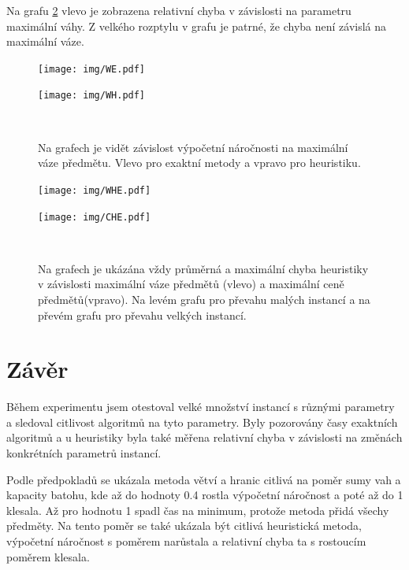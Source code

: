 \documentclass[11pt]{article}
\begin{document}
Na grafu \ref{fig:WCEI} vlevo je zobrazena relativní chyba v závislosti na parametru maximální váhy. Z velkého rozptylu v grafu je patrné, že chyba není závislá na maximální váze. 

\begin{figure}
	\centering
    \begin{minipage}[c]{0.49\textwidth}
        \centering\texttt{[image: img/WE.pdf]} 
    \end{minipage}
    \begin{minipage}[c]{0.49\textwidth}
        \centering \texttt{[image: img/WH.pdf]} 
    \end{minipage}
    \\
   \caption{Na grafech je vidět závislost výpočetní náročnosti na maximální váze předmětu. Vlevo pro exaktní metody a vpravo pro heuristiku.}\label{fig:CI}
    \end{figure} 
        
    
\begin{figure}
	\centering
    \begin{minipage}[c]{0.49\textwidth}
        \centering\texttt{[image: img/WHE.pdf]} 
    \end{minipage}
    \begin{minipage}[c]{0.49\textwidth}
        \centering \texttt{[image: img/CHE.pdf]} 
    \end{minipage}
    \\
   \caption{Na grafech je ukázána vždy průměrná a maximální chyba heuristiky v závislosti maximální váze předmětů (vlevo) a maximální ceně předmětů(vpravo). Na levém grafu pro převahu malých instancí a na převém grafu pro převahu velkých instancí.}\label{fig:WCEI}
    \end{figure} 
    
   




\section{Závěr}
Během experimentu jsem otestoval velké množství instancí s různými parametry a sledoval citlivost algoritmů na tyto parametry. Byly pozorovány časy exaktních algoritmů a u heuristiky byla také měřena relativní chyba v závislosti na změnách konkrétních parametrů instancí. 

Podle předpokladů se ukázala metoda větví a hranic citlivá na poměr sumy vah a kapacity batohu, kde až do hodnoty 0.4 rostla výpočetní náročnost a poté až do 1 klesala. Až pro hodnotu 1 spadl čas na minimum, protože metoda přidá všechy předměty. Na tento poměr se také ukázala být citlivá heuristická metoda, výpočetní náročnost s poměrem narůstala a relativní chyba ta s rostoucím poměrem klesala. 
\end{document}
